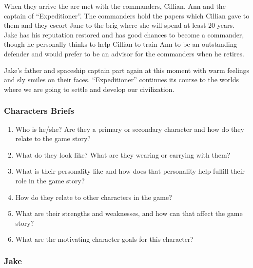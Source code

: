\documentclass{article}
\begin{document}
When they arrive the are met with the commanders, Cillian, Ann and the captain
of ``Expeditioner''. The commanders hold the papers which Cillian gave to them
and they escort Jane to the brig where she will spend at least 20 years. Jake
has his reputation restored and has good chances to become a commander, though
he personally thinks to help Cillian to train Ann to be an outstanding defender
and would prefer to be an advisor for the commanders when he retires.

Jake's father and spaceship captain part again at this moment with warm feelings
and sly smiles on their faces. ``Expeditioner'' continues its course to the
worlds where we are going to settle and develop our civilization.

\subsubsection*{Characters Briefs}

\begin{enumerate}

  \item Who is he/she? Are they a primary or secondary character and how do they
    relate to the game story?

  \item What do they look like? What are they wearing or carrying with them?

  \item What is their personality like and how does that personality help
    fulfill their role in the game story?

  \item How do they relate to other characters in the game?

  \item What are their strengths and weaknesses, and how can that affect the game story?

  \item What are the motivating character goals for this character?

\end{enumerate}

\subsubsection*{Jake}
\end{document}
